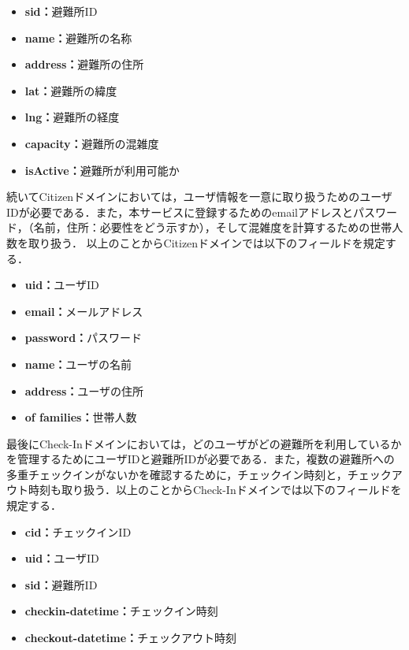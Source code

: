 \documentclass[technicalreport]{ieicej}
\begin{document}
\begin{itemize}
    \item{\textbf{sid：}}避難所ID
    \item{\textbf{name：}}避難所の名称
    \item{\textbf{address：}}避難所の住所
    \item{\textbf{lat：}}避難所の緯度
    \item{\textbf{lng：}}避難所の経度
    \item{\textbf{capacity：}}避難所の混雑度
    \item{\textbf{isActive：}}避難所が利用可能か
\end{itemize}

続いてCitizenドメインにおいては，ユーザ情報を一意に取り扱うためのユーザIDが必要である．また，本サービスに登録するためのemailアドレスとパスワード，（名前，住所：必要性をどう示すか），そして混雑度を計算するための世帯人数を取り扱う．%
以上のことからCitizenドメインでは以下のフィールドを規定する．

\begin{itemize}
    \item{\textbf{uid：}}ユーザID
    \item{\textbf{email：}}メールアドレス
    \item{\textbf{password：}}パスワード
    \item{\textbf{name：}}ユーザの名前
    \item{\textbf{address：}}ユーザの住所
    \item{\textbf{of families：}}世帯人数
\end{itemize}

最後にCheck-Inドメインにおいては，どのユーザがどの避難所を利用しているかを管理するためにユーザIDと避難所IDが必要である．また，複数の避難所への多重チェックインがないかを確認するために，チェックイン時刻と，チェックアウト時刻も取り扱う．以上のことからCheck-Inドメインでは以下のフィールドを規定する．

\begin{itemize}
    \item{\textbf{cid：}}チェックインID
    \item{\textbf{uid：}}ユーザID
    \item{\textbf{sid：}}避難所ID
    \item{\textbf{checkin-datetime：}}チェックイン時刻
    \item{\textbf{checkout-datetime：}}チェックアウト時刻
\end{itemize}
\end{document}
